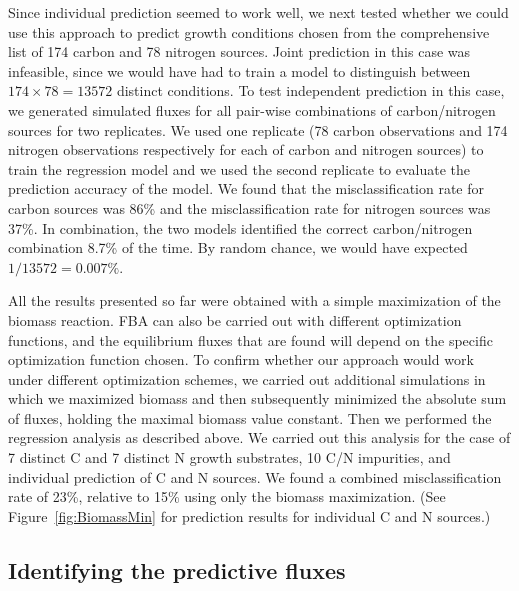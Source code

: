 \documentclass[12pt]{article}
\begin{document}
Since individual prediction seemed to work well, we next tested whether we could use this approach to predict growth conditions chosen from the comprehensive list of 174 carbon and 78 nitrogen sources. Joint prediction in this case was infeasible, since we would have had to train a model to distinguish between $174\times78=13572$ distinct conditions. To test independent prediction in this case, we generated simulated fluxes for all pair-wise combinations of carbon/nitrogen sources for two replicates. We used one replicate (78 carbon observations and 174 nitrogen observations respectively for each of carbon and nitrogen sources) to train the regression model and we used the second replicate to evaluate the prediction accuracy of the model. We found that the misclassification rate for carbon sources was 86\% and the misclassification rate for nitrogen sources was 37\%. In combination, the two models identified the correct carbon/nitrogen combination 8.7\% of the time. By random chance, we would have expected $1/13572=0.007\%$.

All the results presented so far were obtained with a simple maximization of the biomass reaction. FBA can also be carried out with different optimization functions, and the equilibrium fluxes that are found will depend on the specific optimization function chosen. To confirm whether our approach would work under different optimization schemes, we carried out additional simulations in which we maximized biomass and then subsequently minimized the absolute sum of fluxes, holding the maximal biomass value constant. Then we performed the regression analysis as described above. We carried out this analysis for the case of 7 distinct C and 7 distinct N growth substrates, 10 C/N impurities, and individual prediction of C and N sources. We found a combined misclassification rate of 23\%, relative to 15\% using only the biomass maximization. (See Figure~\ref{fig:BiomassMin} for prediction results for individual C and N sources.) 

\subsection{Identifying the predictive fluxes}
\end{document}
